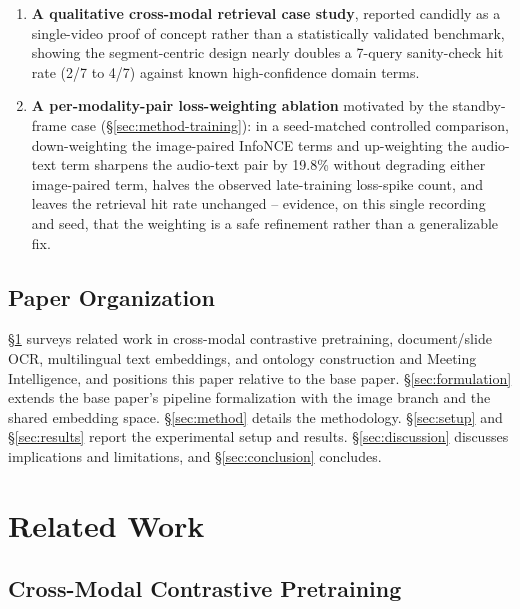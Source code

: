 ﻿\documentclass[twocolumn]{article}
\begin{document}
\begin{enumerate}[leftmargin=*,itemsep=1pt]
  \item \textbf{A qualitative cross-modal retrieval case study}, reported candidly as a
    single-video proof of concept rather than a statistically validated benchmark, showing the
    segment-centric design nearly doubles a 7-query sanity-check hit rate (2/7 to 4/7) against known
    high-confidence domain terms.
  \item \textbf{A per-modality-pair loss-weighting ablation} motivated by the standby-frame case
    (\S\ref{sec:method-training}): in a seed-matched controlled comparison, down-weighting the
    image-paired InfoNCE terms and up-weighting the audio-text term sharpens the audio-text pair by
    19.8\% without degrading either image-paired term, halves the observed late-training loss-spike
    count, and leaves the retrieval hit rate unchanged -- evidence, on this single recording and
    seed, that the weighting is a safe refinement rather than a generalizable fix.
\end{enumerate}

\subsection{Paper Organization}

\S\ref{sec:related} surveys related work in cross-modal contrastive pretraining, document/slide OCR,
multilingual text embeddings, and ontology construction and Meeting Intelligence, and positions this
paper relative to the base paper. \S\ref{sec:formulation} extends the base
paper's pipeline formalization with the image branch and the shared embedding space.
\S\ref{sec:method} details the methodology. \S\ref{sec:setup} and \S\ref{sec:results} report the
experimental setup and results. \S\ref{sec:discussion} discusses implications and limitations, and
\S\ref{sec:conclusion} concludes.

\section{Related Work}
\label{sec:related}

\subsection{Cross-Modal Contrastive Pretraining}
\end{document}
